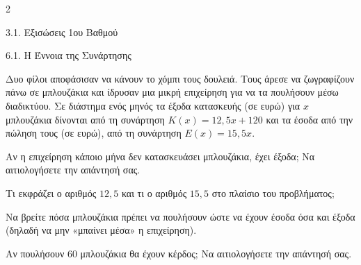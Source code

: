 \begin{ylh}{2}
    \item 3.1. Εξισώσεις 1ου Βαθμού
    \item 6.1. Η Έννοια της Συνάρτησης
\end{ylh}
Δυο φίλοι αποφάσισαν να κάνουν το χόμπι τους δουλειά. Τους άρεσε να ζωγραφίζουν πάνω σε μπλουζάκια και ίδρυσαν μια μικρή επιχείρηση για να τα πουλήσουν μέσω διαδικτύου. Σε διάστημα ενός μηνός τα έξοδα κατασκευής (σε ευρώ) για $x$ μπλουζάκια δίνονται από τη συνάρτηση ${K}(x) = 12,5x + 120$ και τα έσοδα από την πώληση τους (σε ευρώ), από τη συνάρτηση ${E}(x) = 15,5x$.
\begin{alist}
\item Αν η επιχείρηση κάποιο μήνα δεν κατασκευάσει μπλουζάκια, έχει έξοδα; Να αιτιολογήσετε την απάντησή σας.
\item Τι εκφράζει ο αριθμός $12{,}5$ και τι ο αριθμός $15{,}5$ στο πλαίσιο του προβλήματος;

\item Να βρείτε πόσα μπλουζάκια πρέπει να πουλήσουν ώστε να έχουν έσοδα όσα και έξοδα (δηλαδή να μην «μπαίνει μέσα» η επιχείρηση).

\item Αν πουλήσουν 60 μπλουζάκια θα έχουν κέρδος; Να αιτιολογήσετε την απάντησή σας.
\end{alist}

